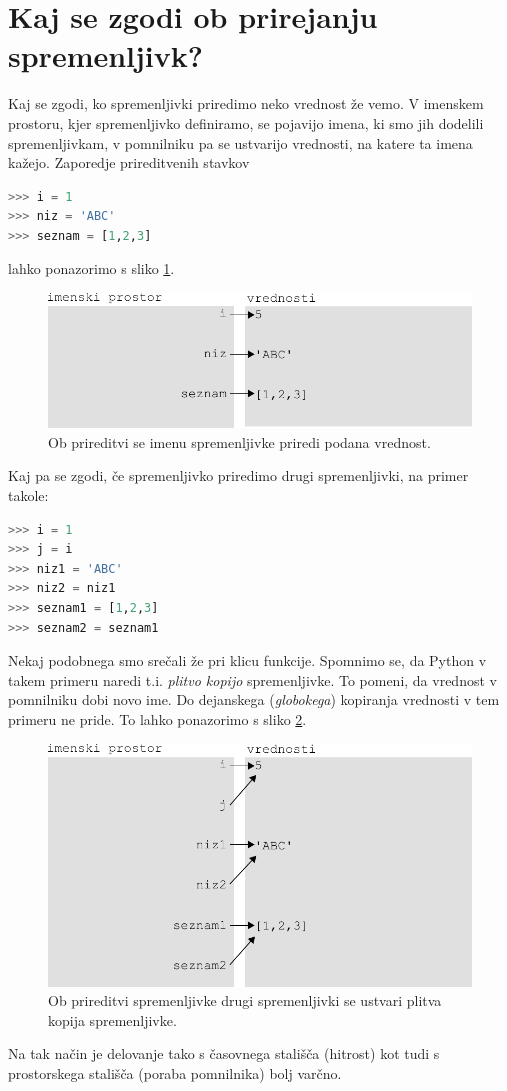 \bigskip

\section{Kaj se zgodi ob prirejanju spremenljivk?}
Kaj se zgodi, ko spremenljivki priredimo neko vrednost že vemo. V imenskem prostoru, kjer spremenljivko definiramo, se pojavijo imena, ki smo jih dodelili spremenljivkam, v pomnilniku pa se ustvarijo vrednosti, na katere ta imena kažejo. Zaporedje prireditvenih stavkov
\begin{lstlisting}[language=Python]
>>> i = 1
>>> niz = 'ABC'
>>> seznam = [1,2,3]
\end{lstlisting}
lahko ponazorimo s sliko \ref{img:spremenljivost}.
\begin{figure}
    \centering
    \includegraphics[width=\linewidth]{img/spremenljivost.pdf}
    \caption{Ob prireditvi se imenu spremenljivke priredi podana vrednost.}
    \label{img:spremenljivost}
\end{figure}
Kaj pa se zgodi, če spremenljivko priredimo drugi spremenljivki, na primer takole:
\begin{lstlisting}[language=Python]
>>> i = 1
>>> j = i
>>> niz1 = 'ABC'
>>> niz2 = niz1
>>> seznam1 = [1,2,3]
>>> seznam2 = seznam1
\end{lstlisting}
Nekaj podobnega smo srečali že pri klicu funkcije. Spomnimo se, da Python v takem primeru naredi t.i. \textit{plitvo kopijo} spremenljivke. To pomeni, da vrednost v pomnilniku dobi novo ime. Do dejanskega (\textit{globokega}) kopiranja vrednosti v tem primeru ne pride. To lahko ponazorimo s sliko \ref{img:spremenljivost_2}.
\begin{figure}
    \centering
    \includegraphics[width=\linewidth]{img/spremenljivost_2.pdf}
    \caption{Ob prireditvi spremenljivke drugi spremenljivki se ustvari plitva kopija spremenljivke.}
    \label{img:spremenljivost_2}
\end{figure}
Na tak način je delovanje tako s časovnega stališča (hitrost) kot tudi s prostorskega stališča (poraba pomnilnika) bolj varčno. 

